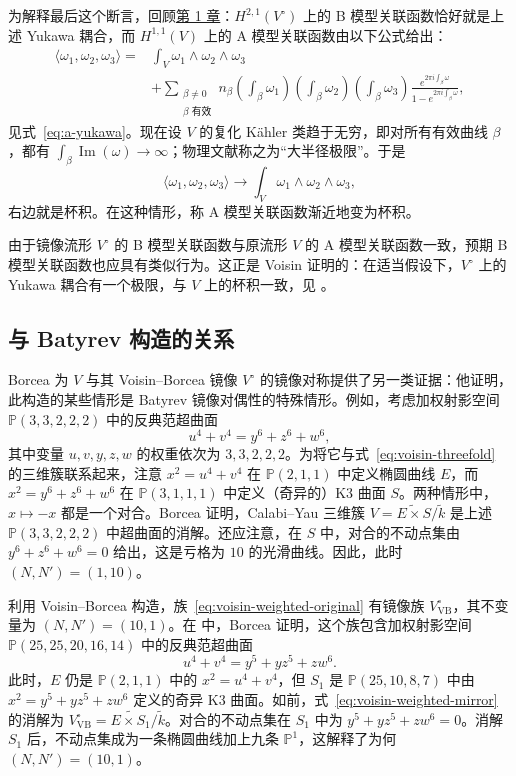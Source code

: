 为解释最后这个断言，回顾\hyperref[chap:introduction]{第 1 章}：$H^{2,1}(V^\circ)$ 上的 B 模型关联函数恰好就是上述 Yukawa 耦合，而 $H^{1,1}(V)$ 上的 A 模型关联函数由以下公式给出：
\[
\begin{aligned}
\langle\omega_1,\omega_2,\omega_3\rangle
={}&\int_V\omega_1\wedge\omega_2\wedge\omega_3\\
&+\sum_{\substack{\beta\ne0\\\beta\text{ 有效}}}n_\beta
\left(\int_\beta\omega_1\right)
\left(\int_\beta\omega_2\right)
\left(\int_\beta\omega_3\right)
\frac{e^{2\pi i\int_\beta\omega}}{1-e^{2\pi i\int_\beta\omega}},
\end{aligned}
\]
见式~\eqref{eq:a-yukawa}。现在设 $V$ 的复化 Kähler 类趋于无穷，即对所有有效曲线 $\beta$，都有 $\int_\beta\operatorname{Im}(\omega)\to\infty$；物理文献称之为“大半径极限”。于是
\[
\langle\omega_1,\omega_2,\omega_3\rangle
\longrightarrow\int_V\omega_1\wedge\omega_2\wedge\omega_3,
\]
右边就是杯积。在这种情形，称 A 模型关联函数渐近地变为杯积。

由于镜像流形 $V^\circ$ 的 B 模型关联函数与原流形 $V$ 的 A 模型关联函数一致，预期 B 模型关联函数也应具有类似行为。这正是 Voisin 证明的：在适当假设下，$V^\circ$ 上的 Yukawa 耦合有一个极限，与 $V$ 上的杯积一致，见 。

\subsection{与 Batyrev 构造的关系}\label{subsec:nonreflexive-weights}

Borcea 为 $V$ 与其 Voisin--Borcea 镜像 $V^\circ$ 的镜像对称提供了另一类证据：他证明，此构造的某些情形是 Batyrev 镜像对偶性的特殊情形。例如，考虑加权射影空间 $\mathbb P(3,3,2,2,2)$ 中的反典范超曲面
\begin{equation}\label{eq:voisin-weighted-original}
u^4+v^4=y^6+z^6+w^6,
\end{equation}
其中变量 $u,v,y,z,w$ 的权重依次为 $3,3,2,2,2$。为将它与式~\eqref{eq:voisin-threefold} 的三维簇联系起来，注意 $x^2=u^4+v^4$ 在 $\mathbb P(2,1,1)$ 中定义椭圆曲线 $E$，而 $x^2=y^6+z^6+w^6$ 在 $\mathbb P(3,1,1,1)$ 中定义（奇异的）K3 曲面 $S$。两种情形中，$x\mapsto-x$ 都是一个对合。Borcea 证明，Calabi--Yau 三维簇 $V=\widetilde{E\times S}/\widetilde k$ 是上述 $\mathbb P(3,3,2,2,2)$ 中超曲面的消解。还应注意，在 $S$ 中，对合的不动点集由 $y^6+z^6+w^6=0$ 给出，这是亏格为 $10$ 的光滑曲线。因此，此时 $(N,N')=(1,10)$。

利用 Voisin--Borcea 构造，族~\eqref{eq:voisin-weighted-original} 有镜像族 $V_{\mathrm{VB}}^\circ$，其不变量为 $(N,N')=(10,1)$。在  中，Borcea 证明，这个族包含加权射影空间 $\mathbb P(25,25,20,16,14)$ 中的反典范超曲面
\begin{equation}\label{eq:voisin-weighted-mirror}
u^4+v^4=y^5+yz^5+zw^6.
\end{equation}
此时，$E$ 仍是 $\mathbb P(2,1,1)$ 中的 $x^2=u^4+v^4$，但 $S_1$ 是 $\mathbb P(25,10,8,7)$ 中由 $x^2=y^5+yz^5+zw^6$ 定义的奇异 K3 曲面。如前，式~\eqref{eq:voisin-weighted-mirror} 的消解为 $V_{\mathrm{VB}}^\circ=\widetilde{E\times S_1}/\widetilde k$。对合的不动点集在 $S_1$ 中为 $y^5+yz^5+zw^6=0$。消解 $S_1$ 后，不动点集成为一条椭圆曲线加上九条 $\mathbb P^1$，这解释了为何 $(N,N')=(10,1)$。

